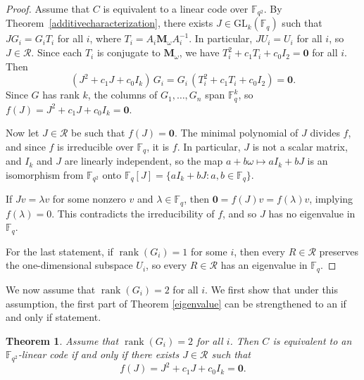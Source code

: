 \documentclass[a4paper,12pt]{article}
\theoremstyle{plain}
\newtheorem{theorem}[lemma]{Theorem}
\theoremstyle{definition}
\begin{document}
\begin{proof} 
Assume that $C$ is equivalent to a linear code over $\mathbb{F}_{q^2}$.
By Theorem~\ref{additivecharacterization}, there exists $J \in \mathrm{GL}_k(\mathbb{F}_q)$ such that $JG_i = G_iT_i$ for all $i$, where $T_i = A_i \mathbf{M}_\omega A_i^{-1}$. 
In particular, $J U_i = U_i$ for all $i$, so $J \in \mathcal{R}$. 
Since each $T_i$ is conjugate to $\mathbf{M}_\omega$, we have $T_i^2 + c_1 T_i + c_0 I_2 =\mathbf{0}$ for all $i$.
Then
\[ 
(J^2 + c_1 J + c_0 I_k)\, G_i = G_i\, (T_i^2 + c_1 T_i + c_0 I_2) =\mathbf{0}. 
\]
Since $G$ has rank $k$, the columns of $G_1, \dots, G_n$ span $\mathbb{F}_q^k$, so $f(J)=J^2 + c_1 J + c_0 I_k = \mathbf{0}$.

Now let $J \in \mathcal{R}$ be such that $f(J) = \mathbf{0}$.
The minimal polynomial of $J$ divides $f$, and since $f$ is irreducible over $\mathbb{F}_q$, it is $f$. 
In particular, $J$ is not a scalar matrix, and $I_k$ and $J$ are linearly independent, so the map $a + b\omega \mapsto aI_k + bJ$ is an isomorphism from $\mathbb{F}_{q^2}$ onto $\mathbb{F}_q[J] = \{aI_k + bJ : a, b \in \mathbb{F}_q\}$.  

If $Jv = \lambda v$ for some nonzero $v$ and $\lambda \in \mathbb{F}_q$, then $\mathbf{0} = f(J)v = f(\lambda)v$, implying $f(\lambda)=0$. This contradicts the irreducibility of $f$, and so $J$ has no eigenvalue in $\mathbb{F}_q$.

For the last statement, if $\operatorname{rank}(G_i) = 1$ for some $i$, then every $R \in \mathcal{R}$ preserves the one-dimensional subspace $U_i$, so every $R \in \mathcal{R}$ has an eigenvalue in $\mathbb{F}_q$.
\end{proof}

We now assume that $\operatorname{rank}(G_i) = 2$ for all $i$. We first show that under this assumption,  the first part of Theorem \ref{eigenvalue} can be strengthened to an if and only if statement.

\begin{theorem} \label{minimalpolyR}
Assume that $\operatorname{rank}(G_i)=2$ for all $i$.
Then $C$ is equivalent to an $\mathbb F_{q^2}$-linear code if and only if
there exists $J\in\mathcal R$ such that
\[
f(J)=J^2+c_1J+c_0I_k=\mathbf 0.
\]
\end{theorem}
\end{document}
